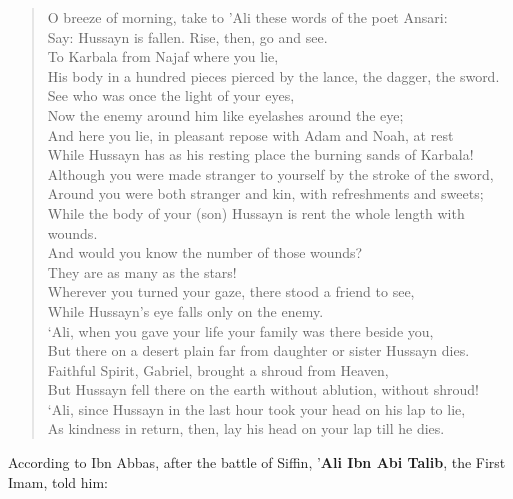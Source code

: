 \begin{verse}
O breeze of morning, take to 'Ali these words of the poet Ansari:\\
Say: Hussayn is fallen. Rise, then, go and see.\\
To Karbala from Najaf where you lie,\\
His body in a hundred pieces pierced by the lance, the dagger, the sword.\\
See who was once the light of your eyes,\\
Now the enemy around him like eyelashes around the eye;\\
And here you lie, in pleasant repose with Adam and Noah, at rest\\
While Hussayn has as his resting place the burning sands of Karbala!\\
Although you were made stranger to yourself by the stroke of the sword,\\
Around you were both stranger and kin, with refreshments and sweets;\\
While the body of your (son) Hussayn is rent the whole length with wounds.\\
And would you know the number of those wounds?\\
They are as many as the stars!\\
Wherever you turned your gaze, there stood a friend to see,\\
While Hussayn's eye falls only on the enemy.\\
`Ali, when you gave your life your family was there beside you,\\
But there on a desert plain far from daughter or sister Hussayn dies.\\
Faithful Spirit, Gabriel, brought a shroud from Heaven,\\
But Hussayn fell there on the earth without ablution, without shroud!\\
`Ali, since Hussayn in the last hour took your head on his lap to lie,\\
As kindness in return, then, lay his head on your lap till he dies.\\
\end{verse}


According to Ibn Abbas, after the battle of Siffin, '\textbf{Ali Ibn Abi Talib}, the First Imam, told him:

